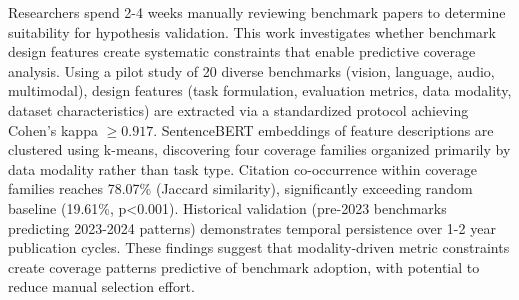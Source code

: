 
Researchers spend 2-4 weeks manually reviewing benchmark papers to determine suitability for hypothesis validation. This work investigates whether benchmark design features create systematic constraints that enable predictive coverage analysis. Using a pilot study of 20 diverse benchmarks (vision, language, audio, multimodal), design features (task formulation, evaluation metrics, data modality, dataset characteristics) are extracted via a standardized protocol achieving Cohen's kappa $\geq 0.917$. SentenceBERT embeddings of feature descriptions are clustered using k-means, discovering four coverage families organized primarily by data modality rather than task type. Citation co-occurrence within coverage families reaches 78.07\% (Jaccard similarity), significantly exceeding random baseline (19.61\%, p<0.001). Historical validation (pre-2023 benchmarks predicting 2023-2024 patterns) demonstrates temporal persistence over 1-2 year publication cycles. These findings suggest that modality-driven metric constraints create coverage patterns predictive of benchmark adoption, with potential to reduce manual selection effort.
